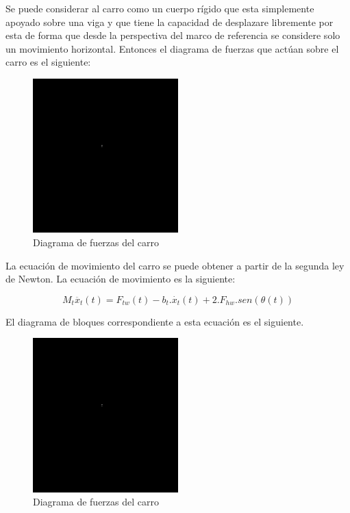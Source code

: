 Se puede considerar al carro como un cuerpo rígido que esta simplemente
apoyado sobre una viga y que tiene la capacidad de desplazare libremente
por esta de forma que desde la perspectiva del marco de referencia se
considere solo un movimiento horizontal. Entonces
el diagrama de fuerzas que actúan sobre el carro es el siguiente:

\begin{figure}[H]
    \centering
    \includegraphics[width=0.5\textwidth]{img/NADA.png}
    \caption{Diagrama de fuerzas del carro}
\end{figure}

La ecuación de movimiento del carro se puede obtener a partir de la segunda
ley de Newton. La ecuación de movimiento es la siguiente:

\begin{equation}
    M_t \ddot{x_t}(t)  = F_{tw}(t) - b_{t} . \dot{x_t}(t) + 2.F_{hw}.sen(\theta(t))
\end{equation}

El diagrama de bloques correspondiente a esta ecuación es el siguiente.

\begin{figure}[H]
    \centering
    \includegraphics[width=0.5\textwidth]{img/NADA.png}
    \caption{Diagrama de fuerzas del carro}
\end{figure}

